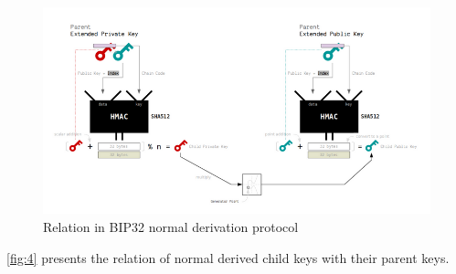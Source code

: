 \bigskip
\begin{figure}[ht!]
    \centering
    \includegraphics[width=1\textwidth]{images/relation_bip32.png}
    \caption[Relation in BIP32 normal derivation protocol]{Relation in BIP32 normal derivation protocol}
    \label{fig:4}
\end{figure}

\autoref{fig:4} presents the relation of normal derived child keys with their parent keys.

